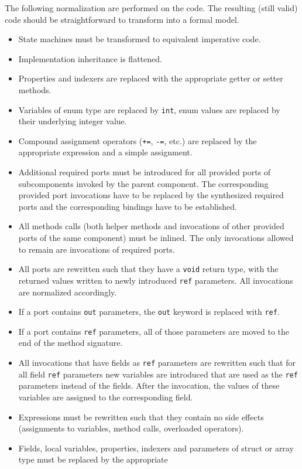 \documentclass[a4paper,10pt,english]{article}
\begin{document}
The following normalization are performed on the \CSharp code. The resulting (still valid) \CSharp code should be straightforward
to transform into a formal model.
\begin{itemize}
	\item State machines must be transformed to equivalent imperative code.
	\item Implementation inheritance is flattened. 
	\item Properties and indexers are replaced with the appropriate getter or setter methods.
	\item Variables of enum type are replaced by \texttt{int}, enum values are replaced by their underlying integer value.
	\item Compound assignment operators (\texttt{+=}, \texttt{-=}, etc.) are replaced by the appropriate expression and a simple
	assignment.
	\item Additional required ports must be introduced for all provided ports of subcomponents invoked by the parent component. The
	corresponding provided port invocations have to be replaced by the synthesized required ports and the corresponding bindings have
	to be established.
	\item All methods calls (both helper methods and invocations of other provided ports of the same component) must be inlined. The
	only invocations allowed to remain are invocations of required ports.
	\item All ports are rewritten such that they have a \texttt{void} return type, with the returned values written to newly
	introduced \texttt{ref} parameters. All invocations are normalized accordingly.
	\item If a port contains \texttt{out} parameters, the \texttt{out} keyword is replaced with \texttt{ref}.
	\item If a port contains \texttt{ref} parameters, all of those parameters are moved to the end of the method signature.
	\item All invocations that have fields as \texttt{ref} parameters are rewritten such that for all field \texttt{ref} parameters new variables are
	introduced that are used as the \texttt{ref} parameters instead of the fields. After the invocation, the values of these
	variables are assigned to the corresponding field.
	\item Expressions must be rewritten such that they contain no side effects (assignments to variables, method calls, overloaded
	operators).
	\item Fields, local variables, properties, indexers and parameters of struct or array type must be replaced by the appropriate

\end{itemize}
\end{document}
